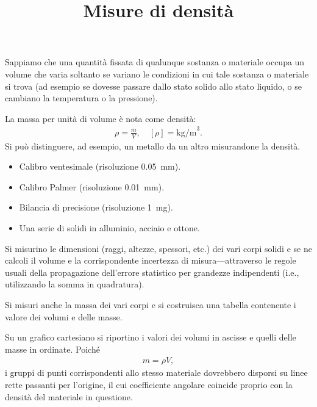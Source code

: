 \documentclass{lab1-article}
\title{Misure di densit\`a}
\begin{document}
\begin{article}

\maketitle

\secsummary
Sappiamo che una quantit\`a fissata di qualunque sostanza o materiale occupa un
volume che varia soltanto se variano le condizioni in cui tale sostanza o
materiale si trova (ad esempio se dovesse passare dallo stato solido allo stato
liquido, o se cambiano la temperatura o la pressione).

La massa per unit\`a di volume \`e nota come densit\`a:
\begin{align}
  \rho = \frac{m}{V}, \quad [\rho]= \mathrm{kg/m}^3.
\end{align}
Si pu\`o distinguere, ad esempio, un metallo da un altro misurandone la
densit\`a.


\secmaterials

\begin{itemize}
\item Calibro ventesimale (risoluzione 0.05~mm).
\item Calibro Palmer (risoluzione 0.01~mm).
\item Bilancia di precisione (risoluzione 1~mg).
\item Una serie di solidi in alluminio, acciaio e ottone.

\end{itemize}






\secmeasurements


Si misurino le dimensioni (raggi, altezze, spessori, etc.) dei vari corpi
solidi e se ne calcoli il volume e la corrispondente incertezza di
misura---attraverso le regole usuali della propagazione dell'errore statistico
per grandezze indipendenti (i.e., utilizzando la somma in quadratura).

Si misuri anche la massa dei vari corpi e si costruisca una tabella
contenente i valore dei volumi e delle masse.



Su un grafico cartesiano si riportino i valori dei volumi in ascisse e quelli
delle masse in ordinate. Poich\'e
\begin{align}
  m = \rho V,
\end{align}
i gruppi di punti corrispondenti allo stesso materiale dovrebbero disporsi su
linee rette passanti per l'origine, il cui coefficiente angolare coincide
proprio con la densit\`a del materiale in questione.


\end{article}
\end{document}
